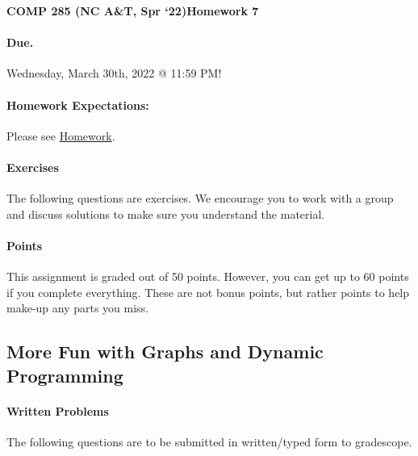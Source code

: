 \documentclass [12pt]{article}
\begin{document}
 

{\LARGE \textbf {COMP 285 (NC A\&T, Spr `22)}\hfill \textbf {Homework 7} } 
\vspace {1em} 
\begin{Instruction} 

\paragraph {Due.} Wednesday, March 30th, 2022 @ 11:59 PM!
\end{Instruction} 

\vspace {1em} 
\begin{Instruction} \paragraph {Homework Expectations:} Please see \href{https://www.comp285.ml/homework/#general-homework-information}{Homework}.
\end{Instruction}

\vspace {1em} 
\begin{Instruction} 

\paragraph {Exercises} The following questions are exercises. We encourage you to work with a group and discuss solutions to make sure you understand the material.

\paragraph {Points} This assignment is graded out of 50 points. However, you can get up to 60 points if you complete everything. These are not bonus points, but rather points to help make-up any parts you miss.

\end{Instruction} 

\begin{centering}
\section*{More Fun with Graphs and Dynamic Programming}
\end{centering}

\begin{Instruction}

\paragraph{Written Problems} The following questions are to be submitted in written/typed form to gradescope.

\end{Instruction}
\end{document}
